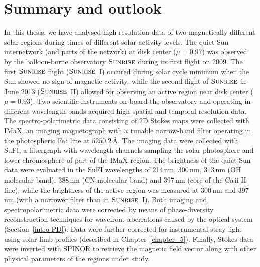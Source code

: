 \documentclass[goettingen, gauss, print]{thesis}
\begin{document}
\chapter{Summary and outlook}
\label{chapter_6}

In this thesis, we have analysed high resolution data of two magnetically different solar regions during times of different solar activity levels. The quiet-Sun internetwork (and parts of the network) at disk center ($\mu = 0.97$) was observed by the balloon-borne observatory $\textsc{Sunrise}$ during its first flight on 2009. The first $\textsc{Sunrise}$ flight ($\textsc{Sunrise}$~I) occured during solar cycle minimum when the Sun showed no sign of magnetic activity, while the second flight of $\textsc{Sunrise}$ in June 2013 ($\textsc{Sunrise}$~II) allowed for observing an active region near disk center ($\mu=0.93$).
Two scientific instruments on-board the observatory and operating in different wavelength bands acquired high spatial and temporal resolution data. The spectro-polarimetric data consisting of 2D Stokes maps were collected with IMaX, an imaging magnetograph with a tunable narrow-band filter operating in the photospheric Fe\,{\sc i} line at $5250.2$\,\AA{}. The imaging data were collected with SuFI, a filtergraph with wavelength channels sampling the solar photosphere and lower chromosphere of part of the IMaX region. The brightness of the quiet-Sun data were evaluated in the SuFI wavelengths of 214\,nm, 300\,nm, 313\,nm (OH molecular band), 388\,nm (CN molecular band) and 397\,nm (core of the Ca\,{\sc ii} H line), while the brightness of the active region was measured at 300\,nm and 397\,nm (with a narrower filter than in $\textsc{Sunrise}$~I). Both imaging and spectropolarimetric data were corrected by means of phase-diversity reconstruction techniques for wavefront aberrations caused by the optical system (Section~\ref{intro-PD}). Data were further corrected for instrumental stray light using solar limb profiles (described in Chapter~\ref{chapter_5}). Finally, Stokes data were inverted with SPINOR to retrieve the magnetic field vector along with other physical parameters of the regions under study.
\end{document}
